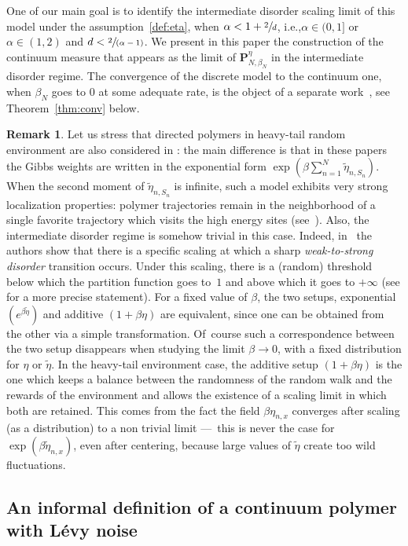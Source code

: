 \documentclass[11pt]{article}
\newcommand{\ie}{i.e.,\xspace}
\newcommand{\Subsection}{\subsection}
\numberwithin{equation}{section}
\newcommand{\spfrac}[2]{\sfrac{#1}{(#2)}}
\theoremstyle{definition}
\newtheorem{rem}[theorem]{Remark}
\newcommand{\bP}{{\ensuremath{\mathbf P}} }
\let\gb\beta
\begin{document}
One of our main goal is to identify the intermediate disorder scaling limit of this model under the assumption~\eqref{def:eta}, when $\alpha<1+\sfrac{2}{d}$, \ie $\alpha\in (0,1]$ or $\alpha \in (1,2)$ and $d<\spfrac{2}{\alpha-1}$.
We present in this paper the construction of the continuum measure that appears as the limit of $\bP_{N,\gb_N}^{\eta}$ in the intermediate disorder regime. The convergence of the discrete model to the continuum one, when $\beta_N$ goes to $0$
at some adequate rate, is the object of a separate work~\cite{BL20_disc},
see Theorem~\ref{thm:conv} below.

\begin{rem}
\label{rem:weights}
Let us stress that
directed polymers in heavy-tail random environment are also considered in \cite{AL11,BT19,DZ16}:
the main difference is that in these papers the Gibbs weights are written in the exponential form $\exp(\gb \sum_{n=1}^N \tilde \eta_{n,S_n})$.
When the second moment of $\tilde \eta_{n,S_n}$ is infinite,
such a model exhibits very strong localization properties:
polymer trajectories remain in the neighborhood of a single favorite trajectory which visits the high energy sites (see~\cite{AL11,BT19}).
Also, the intermediate disorder regime is somehow trivial
in this case. Indeed, in~\cite{BT19} the authors show that there is a specific scaling at which
a sharp \emph{weak-to-strong disorder} transition occurs.
Under this scaling, there is a (random) threshold below which
the partition function goes to~$1$ and above which it goes to $+\infty$ (see \cite[Th.\,2.7-2.8]{BT19}
for a more precise statement).
For a fixed value of $\beta$, the two setups, exponential $(e^{\gb \tilde \eta})$ and additive $(1+\beta\eta)$ are equivalent, since one can be obtained from the other via a simple transformation. Of~course such a correspondence between the two setup disappears when studying the limit $\beta\to 0$, with a fixed distribution for $\eta$ or $\tilde \eta$. In the heavy-tail environment case, the additive setup $(1+\beta \eta)$ is the one which keeps a balance between the randomness of the random walk and the rewards of the environment and allows the existence of a scaling limit in which both are retained.
This comes from the fact the field $\gb \eta_{n,x}$ converges after scaling (as a distribution) to a non trivial limit ---~this is never the case for $\exp(\gb \tilde \eta_{n,x})$, even after centering, because large values of $\tilde \eta$ create too wild fluctuations.
\end{rem}

\Subsection{An informal definition of a continuum polymer with Lévy noise}
\end{document}
